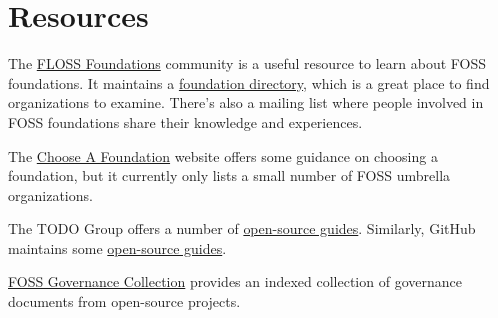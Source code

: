 


\chapter{Resources}

The \href{https://flossfoundations.org/}{FLOSS Foundations} community is a useful resource to learn about FOSS foundations.  It maintains a \href{https://flossfoundations.org/foundation-directory/}{foundation directory}, which is a great place to find organizations to examine.  There's also a mailing list where people involved in FOSS foundations share their knowledge and experiences.

The \href{http://chooseafoundation.com/}{Choose A Foundation} website offers some guidance on choosing a foundation, but it currently only lists a small number of FOSS umbrella organizations.

The TODO Group offers a number of \href{https://todogroup.org/guides/}{open-source guides}.  Similarly, GitHub maintains some \href{https://opensource.guide/}{open-source guides}.

\href{https://fossgovernance.org/}{FOSS Governance Collection} provides an indexed collection of governance documents from open-source projects.

